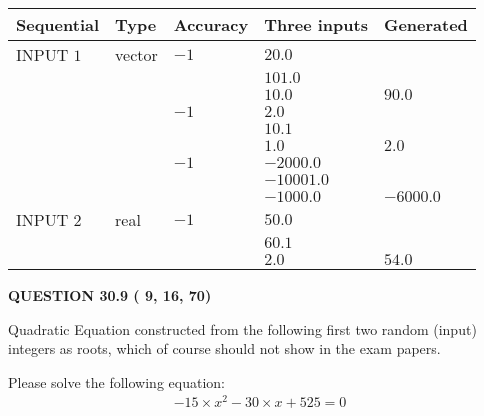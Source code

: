 \documentclass[12pt]{article}
\begin{document}
  
\noindent\begin{tabular}{|l|l|l|l|l|}
\hline
 Sequential & Type & Accuracy & Three inputs & Generated \\ 
\hline
 
 
  INPUT $           1$ & vector & $          -1 $ & $
20.0
  $ & \\
  & & & $
101.0
  $ & \\
  & & & $
10.0
$ & $ 90.0 $ 
  \\
  & & $          -1 $ & $
2.0
  $ & \\
  & & & $
10.1
  $ & \\
  & & & $
1.0
$ & $ 2.0 $ 
  \\
  & & $          -1 $ & $
-2000.0
  $ & \\
  & & & $
-10001.0
  $ & \\
  & & & $
-1000.0
$ & $ -6000.0 $ 
 \\  \hline  
 
 
  INPUT $           2$ & real & $          -1 $ & $
 50.0
  $ & \\
  & & &  $
 60.1
  $ & \\
  & & &  $
 2.0
 $ & $ 54.0 $ 
 \\  \hline  
 \end{tabular}
   
   
  
\vspace{0.2in}
  
{\textbf{\Large{QUESTION
30.9 
 (          9,         16,         70)
}}}
  
  


\noindent{}
Quadratic Equation constructed from the following first two random (input) integers as roots,  
which of course should not show in the exam papers.  
\noindent{}


 
 

 
Please solve the following equation:
\begin{eqnarray*}
-15 \times x^2  %
-30
                 \times x    %
+  %
525 =0
\end{eqnarray*}
 
 
 
\noindent{}
 
 
\end{document}
